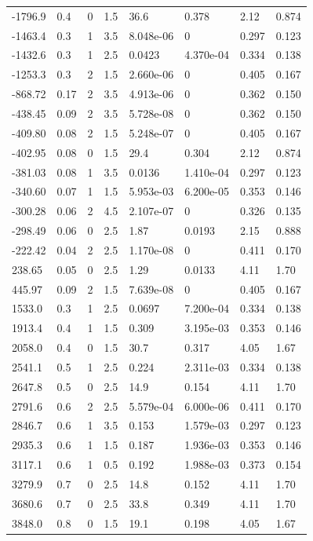 \documentclass[preview]{standalone}
\begin{document}
{{\begin{tabular}{L{1.2cm}C{1.2cm} C{0.3cm}C{0.5cm} C{1.4cm}C{1.4cm} C{1.4cm}C{1.4cm}}
  -1796.9  &   0.4  & 0     & 1.5 &  36.6  & 0.378  & 2.12 &  0.874   \\ 
  -1463.4  &   0.3  & 1     & 3.5 &  8.048e-06  & 0  & 0.297 &  0.123   \\ 
  -1432.6  &   0.3  & 1     & 2.5 &  0.0423  & 4.370e-04  & 0.334 &  0.138   \\ 
  -1253.3  &   0.3  & 2     & 1.5 &  2.660e-06  & 0  & 0.405 &  0.167   \\ 
  -868.72  &  0.17  & 2     & 3.5 &  4.913e-06  & 0  & 0.362 &  0.150   \\ 
  -438.45  &  0.09  & 2     & 3.5 &  5.728e-08  & 0  & 0.362 &  0.150   \\ 
  -409.80  &  0.08  & 2     & 1.5 &  5.248e-07  & 0  & 0.405 &  0.167   \\ 
  -402.95  &  0.08  & 0     & 1.5 &  29.4  & 0.304  & 2.12 &  0.874   \\ 
  -381.03  &  0.08  & 1     & 3.5 &  0.0136  & 1.410e-04  & 0.297 &  0.123   \\ 
  -340.60  &  0.07  & 1     & 1.5 &  5.953e-03  & 6.200e-05  & 0.353 &  0.146   \\ 
  -300.28  &  0.06  & 2     & 4.5 &  2.107e-07  & 0  & 0.326 &  0.135   \\ 
  -298.49  &  0.06  & 0     & 2.5 &  1.87  & 0.0193  & 2.15 &  0.888   \\ 
  -222.42  &  0.04  & 2     & 2.5 &  1.170e-08  & 0  & 0.411 &  0.170   \\ 
  238.65  &  0.05  & 0     & 2.5 &  1.29  & 0.0133  & 4.11 &  1.70   \\ 
  445.97  &  0.09  & 2     & 1.5 &  7.639e-08  & 0  & 0.405 &  0.167   \\ 
  1533.0  &   0.3  & 1     & 2.5 &  0.0697  & 7.200e-04  & 0.334 &  0.138   \\ 
  1913.4  &   0.4  & 1     & 1.5 &  0.309  & 3.195e-03  & 0.353 &  0.146   \\ 
  2058.0  &   0.4  & 0     & 1.5 &  30.7  & 0.317  & 4.05 &  1.67   \\ 
  2541.1  &   0.5  & 1     & 2.5 &  0.224  & 2.311e-03  & 0.334 &  0.138   \\ 
  2647.8  &   0.5  & 0     & 2.5 &  14.9  & 0.154  & 4.11 &  1.70   \\ 
  2791.6  &   0.6  & 2     & 2.5 &  5.579e-04  & 6.000e-06  & 0.411 &  0.170   \\ 
  2846.7  &   0.6  & 1     & 3.5 &  0.153  & 1.579e-03  & 0.297 &  0.123   \\ 
  2935.3  &   0.6  & 1     & 1.5 &  0.187  & 1.936e-03  & 0.353 &  0.146   \\ 
  3117.1  &   0.6  & 1     & 0.5 &  0.192  & 1.988e-03  & 0.373 &  0.154   \\ 
  3279.9  &   0.7  & 0     & 2.5 &  14.8  & 0.152  & 4.11 &  1.70   \\ 
  3680.6  &   0.7  & 0     & 2.5 &  33.8  & 0.349  & 4.11 &  1.70   \\ 
  3848.0  &   0.8  & 0     & 1.5 &  19.1  & 0.198  & 4.05 &  1.67   \\ 
\hline 
\end{tabular} 

}}
\end{document}
